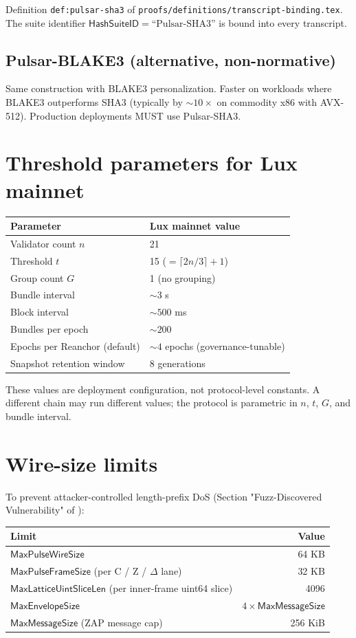 \documentclass[11pt,a4paper]{article}
\begin{document}
Definition \texttt{def:pulsar-sha3} of \texttt{proofs/definitions/transcript-binding.tex}. The suite identifier $\mathsf{HashSuiteID} = \text{``Pulsar-SHA3''}$ is bound into every transcript.

\subsection{Pulsar-BLAKE3 (alternative, non-normative)}

Same construction with BLAKE3 personalization. Faster on workloads where BLAKE3 outperforms SHA3 (typically by $\sim 10\times$ on commodity x86 with AVX-512). Production deployments MUST use Pulsar-SHA3.

\section{Threshold parameters for Lux mainnet}

\begin{tabular}{@{}p{}p{}@{}}
  \toprule
  \textbf{Parameter} & \textbf{Lux mainnet value} \\
  \midrule
  Validator count $n$ & 21 \\
  Threshold $t$ & 15 ($= \lceil 2n/3 \rceil + 1$) \\
  Group count $G$ & 1 (no grouping) \\
  Bundle interval & $\sim 3$ s \\
  Block interval & $\sim 500$ ms \\
  Bundles per epoch & $\sim 200$ \\
  Epochs per Reanchor (default) & $\sim 4$ epochs (governance-tunable) \\
  Snapshot retention window & 8 generations \\
  \bottomrule
\end{tabular}

These values are deployment configuration, not protocol-level constants. A different chain may run different values; the protocol is parametric in $n$, $t$, $G$, and bundle interval.

\section{Wire-size limits}

To prevent attacker-controlled length-prefix DoS (Section "Fuzz-Discovered Vulnerability" of \cite{luxwarpv2}):

\begin{tabular}{@{}lr@{}}
  \toprule
  \textbf{Limit} & \textbf{Value} \\
  \midrule
  $\mathsf{MaxPulseWireSize}$ & 64 KB \\
  $\mathsf{MaxPulseFrameSize}$ (per C / Z / $\Delta$ lane) & 32 KB \\
  $\mathsf{MaxLatticeUintSliceLen}$ (per inner-frame uint64 slice) & 4096 \\
  $\mathsf{MaxEnvelopeSize}$ & $4 \times \mathsf{MaxMessageSize}$ \\
  $\mathsf{MaxMessageSize}$ (ZAP message cap) & 256 KiB \\
  \bottomrule
\end{tabular}
\end{document}

